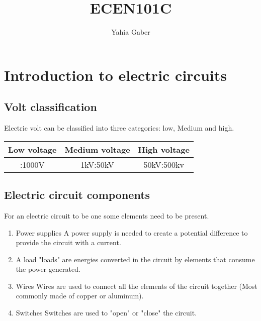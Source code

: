 \documentclass[a4paper]{book}
\author{Yahia Gaber}
\title{ECEN101C}
\begin{document}
\maketitle
\tableofcontents

\section{Introduction to electric circuits}

\subsection{Volt classification}

Electric volt can be classified into three categories: low, Medium and high.

\begin{center}

  \begin{tabular}{| c | c | c |}

    \hline
    Low voltage & Medium voltage & High voltage \\
    \hline
    :1000V & 1kV:50kV & 50kV:500kv \\
    \hline

  \end{tabular}

\end{center}

\subsection{Electric circuit components}

For an electric circuit to be one some elements need to be present.

\begin{enumerate}

  \item Power supplies
    A power supply is needed to create a potential difference to provide the circuit with a current.

  \item A load
    "loads" are energies converted in the circuit by elements that consume the power generated.

  \item Wires
    Wires are used to connect all the elements of the circuit together (Most commonly made of copper or aluminum).

  \item Switches
    Switches are used to "open" or "close" the circuit.

\end{enumerate}
\end{document}
